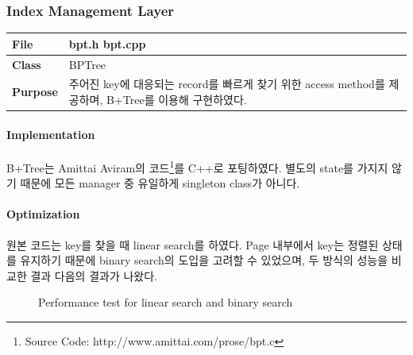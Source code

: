 \documentclass[main.tex]{subfiles}
\begin{document}
\newpage
\subsubsection{Index Management Layer}
\begin{table}[!htb]
	\begin{tabularx}{\textwidth}{|l|X|}
		\hline
		\textbf{File} & bpt.h bpt.cpp \\
		\hline
		\textbf{Class} & BPTree \\
		\hline
		\textbf{Purpose} & 주어진 key에 대응되는 record를 빠르게 찾기 위한 access method를 제공하며, B+Tree를 이용해 구현하였다. \\
		\hline
	\end{tabularx}
\end{table}

\paragraph{Implementation}
B+Tree는 Amittai Aviram의 코드\footnote{Source Code: http://www.amittai.com/prose/bpt.c}를 C++로 포팅하였다.
별도의 state를 가지지 않기 때문에 모든 manager 중 유일하게 singleton class가 아니다.

\paragraph{Optimization}
원본 코드는 key를 찾을 때 linear search를 하였다. Page 내부에서 key는 정렬된 상태를 유지하기 때문에 binary search의 도입을 고려할 수 있었으며, 두 방식의 성능을 비교한 결과 다음의 결과가 나왔다.

\begin{figure}[!htb]
	\centering
	\caption{Performance test for linear search and binary search}
\end{figure}
\end{document}
